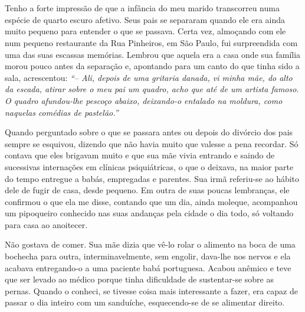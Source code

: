 \chapter{}
Tenho a forte impressão de que a infância do meu marido transcorreu numa espécie de quarto escuro afetivo.
Seus pais se separaram quando ele era ainda muito pequeno para entender o que se passava.
Certa vez, almoçando com ele num pequeno restaurante da Rua Pinheiros, em São Paulo, fui surpreendida com uma das suas escassas memórias.
Lembrou que aquela era a casa onde sua família morou pouco antes da separação e, apontando para um canto do que tinha sido a sala, acrescentou:
\textit{``-- Ali, depois de uma gritaria danada, vi minha mãe, do alto da escada, atirar sobre o meu pai um quadro, acho que até de um artista famoso.
O quadro afundou-lhe pescoço abaixo, deixando-o entalado na moldura, como naquelas comédias de pastelão.'' }

Quando perguntado sobre o que se passara antes ou depois do divórcio dos pais sempre se esquivou, dizendo que não havia muito que valesse a pena recordar.
Só contava que eles brigavam muito e que sua mãe vivia entrando e saindo de sucessivas internações em clínicas psiquiátricas, o que o deixava, na maior parte do tempo entregue a babás, empregadas e parentes.
Sua irmã referiu-se ao hábito dele de fugir de casa, desde pequeno.
Em outra de suas poucas lembranças, ele confirmou o que ela me disse, contando que um dia, ainda moleque, acompanhou um pipoqueiro conhecido nas suas andanças pela cidade o dia todo, só voltando para casa ao anoitecer.

Não gostava de comer.
Sua mãe dizia que vê-lo rolar o alimento na boca de uma bochecha para outra, interminavelmente, sem engolir, dava-lhe nos nervos e ela acabava entregando-o a uma paciente babá portuguesa.
Acabou anêmico e teve que ser levado ao médico porque tinha dificuldade de sustentar-se sobre as pernas.
Quando o conheci, se tivesse coisa mais interessante a fazer, era capaz de passar o dia inteiro com um sanduíche, esquecendo-se de se alimentar direito.

